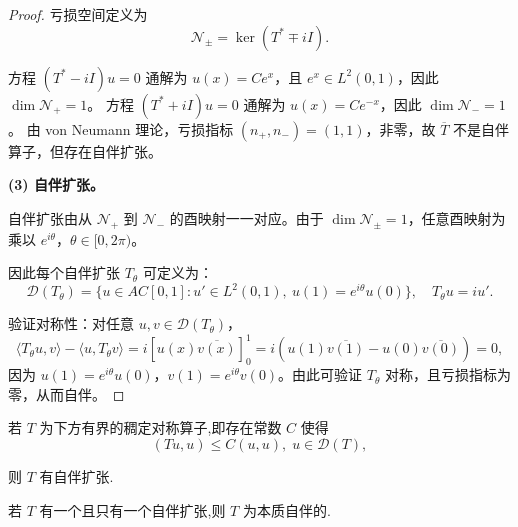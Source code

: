 \documentclass[lang=cn,newtx,10pt,scheme=chinese,thmcnt=chapter]{elegantbook}
\begin{document}
\begin{problemset}
\begin{proof}
亏损空间定义为
\[
\mathcal N_\pm = \ker(T^* \mp i I).
\]

方程 $(T^* - i I)u = 0$ 通解为 $u(x) = C e^x$，且 $e^x \in L^2(0,1)$，因此 $\dim \mathcal N_+ = 1$。  
方程 $(T^* + i I)u = 0$ 通解为 $u(x) = C e^{-x}$，因此 $\dim \mathcal N_- = 1$。  
由 von Neumann 理论，亏损指标 $(n_+, n_-) = (1,1)$，非零，故 $\overline T$ 不是自伴算子，但存在自伴扩张。

\textbf{(3) 自伴扩张。} 

自伴扩张由从 $\mathcal N_+$ 到 $\mathcal N_-$ 的酉映射一一对应。由于 $\dim \mathcal N_\pm = 1$，任意酉映射为乘以 $e^{i\theta}$，$\theta \in [0,2\pi)$。

因此每个自伴扩张 $T_\theta$ 可定义为：
\[
\mathcal D(T_\theta) = \{ u \in AC[0,1] : u' \in L^2(0,1),\ u(1) = e^{i\theta} u(0) \}, \quad
T_\theta u = i u'.
\]

验证对称性：对任意 $u,v \in \mathcal D(T_\theta)$，
\[
\langle T_\theta u, v \rangle - \langle u, T_\theta v \rangle
= i[u(x) \overline{v(x)}]_0^1 = i(u(1)\overline{v(1)} - u(0)\overline{v(0)}) = 0,
\]
因为 $u(1)=e^{i\theta} u(0)$，$v(1)=e^{i\theta} v(0)$。由此可验证 $T_\theta$ 对称，且亏损指标为零，从而自伴。
\end{proof}
\item  若 \(T\) 为下方有界的稠定对称算子,即存在常数 \(C\) 使得
\begin{equation*}
\left( {{Tu},u}\right)  \leq  C\left( {u,u}\right) ,\;u \in  \mathcal{D}(T) ,
\end{equation*}

则 \(T\) 有自伴扩张.
\item  若 \(T\) 有一个且只有一个自伴扩张,则 \(T\) 为本质自伴的.

\end{problemset}
\end{document}
